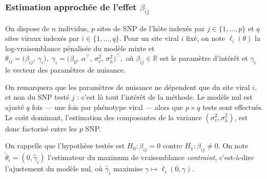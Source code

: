 \documentclass[11pt,a4paper]{article}
\begin{document}
\subsubsection{Estimation approchée de l'effet $\beta_{ij}$}
\label{sec:onestep}


On dispose de $n$ individus, $p$ sites de SNP de l'hôte indexés par
$j \in \{1, \dots, p\}$ et $q$ sites viraux indexés par
$i \in \{1, \dots, q\}$. Pour un site viral $i$ fixé, on note
$\ell_i(\theta)$ la log-vraisemblance pénalisée du modèle mixte et $\theta_{ij} = \bigl(\beta_{ij},\, \gamma_i\bigr),
  \;
  \gamma_i = \bigl(\beta_0,\, \alpha^{\top},\, \sigma^2_v,\, \sigma^2_h\bigr)^{\top},$
où $\beta_{ij} \in \mathbb{R}$ est le paramètre d'intérêt et $\gamma_i$ le
vecteur des paramètres de nuisance.
\\
\vspace{0.5cm}

On remarquera que les paramètres de nuisance ne dépendent que du site viral $i$, et non du SNP
testé $j$ : c'est là tout l'intérêt de la méthode. Le modèle nul est ajusté
$q$ fois --- une fois par phénotype viral --- alors que $p \times q$ tests
sont effectués. Le coût dominant, l'estimation des composantes de la variance
$(\sigma^2_v, \sigma^2_h)$, est donc factorisé entre les $p$ SNP.
\\
\vspace{0.5cm}

On rappelle que l'hypothèse testée est $H_0 : \beta_{ij} = 0$ contre $H_1 : \beta_{ij} \neq 0$.
On note $\tilde{\theta}_i = (0, \hat{\gamma}_i)$ l'estimateur du maximum de
vraisemblance \emph{contraint}, c'est-à-dire l'ajustement du modèle nul, où
$\hat{\gamma}_i$ maximise $\gamma \mapsto \ell_i(0, \gamma)$.
\\
\vspace{0.5cm}
\end{document}
